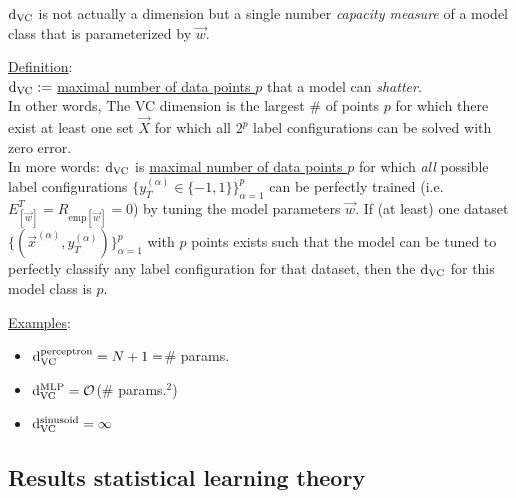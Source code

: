 \begin{frame}\frametitle{\secname}

$\mathrm{d}_{\mathrm{VC}}$ is not actually a dimension but a single number \emph{capacity measure} 
of a model class that is parameterized by $\vec w$.

\underline{Definition}:\\

$\mathrm{d}_{\mathrm{VC}} :=$ \underline{maximal number of data points $p$} that a model can \emph{shatter}.\\

In other words, The VC dimension is the largest \# of points  
$p$ for which there exist at least one set  
$\vec X$ for which all  
$2^p$ label configurations can be solved with zero error.\\

In more words: $\mathrm{d}_{\mathrm{VC}}$ is \underline{maximal number of data points $p$} for which \emph{all} possible label configurations $\{y_{T}^{(\alpha)} \in \{-1,1\}\}_{\alpha=1}^{p}$ can be perfectly trained (i.e. $E^{T}_{[\vec w]} = R_{\text{emp}[\vec w]} = 0$) by tuning the model parameters $\vec w$.
If (at least) one dataset $\{(\vec x^{(\alpha)}, y_{T}^{(\alpha)})\}_{\alpha=1}^{p}$ with $p$ points exists such that the model can be tuned to perfectly classify any label configuration for that dataset, then the $\mathrm{d}_{\mathrm{VC}}$ for this model class is $p$.



\end{frame}

\begin{frame}

\underline{Examples}:

\begin{itemize}
\item $\mathrm{d}_{\mathrm{VC}}^{\text{perceptron}} = N+1 = $\# params.
\item $\mathrm{d}_{\mathrm{VC}}^{\text{MLP}} = \mathcal{O}$(\# params.$^{2}$)
\item $\mathrm{d}_{\mathrm{VC}}^{\text{sinusoid}} = \infty$
\end{itemize}
    
\end{frame}

\subsection{Results statistical learning theory}

